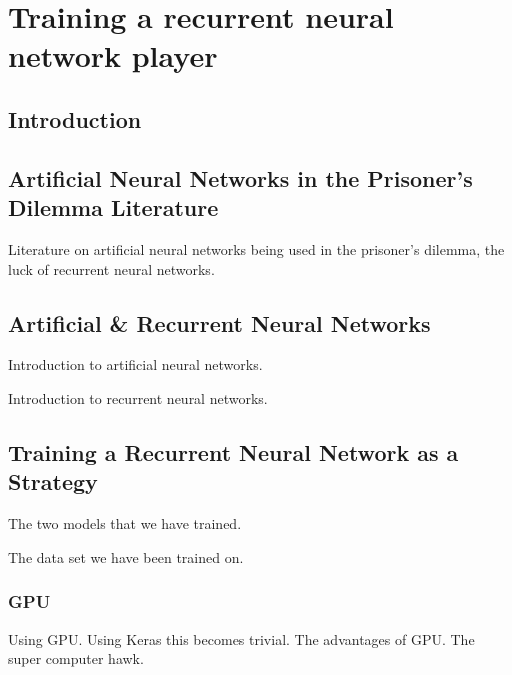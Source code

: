 \chapter{Training a recurrent neural network player}\label{chapter:lstm}

\section{Introduction}

\section{Artificial Neural Networks in the Prisoner's Dilemma Literature}

Literature on artificial neural networks being used in the prisoner's dilemma,
the luck of recurrent neural networks.

\section{Artificial \& Recurrent Neural Networks}

Introduction to artificial neural networks.

\begin{figure}
    \centering
    
\end{figure}

Introduction to recurrent neural networks.

\begin{figure}
    \centering
    
\end{figure}

\section{Training a Recurrent Neural Network as a Strategy}

The two models that we have trained.

The data set we have been trained on.

\subsection{GPU}

Using GPU. Using Keras this becomes trivial. The advantages of GPU. The super
computer hawk.

